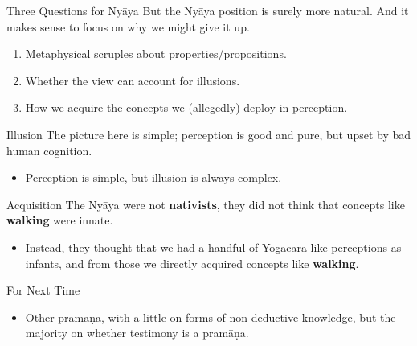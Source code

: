 \documentclass[
  17pt,
  letterpaper,
  ignorenonframetext,
  aspectratio=169,
  handout]{beamer}
\providecommand{\tightlist}{%
  \setlength{\itemsep}{0pt}\setlength{\parskip}{0pt}}\usepackage{longtable,booktabs,array}
\begin{document}
\begin{frame}{Three Questions for Nyāya}
\protect\hypertarget{three-questions-for-nyux101ya}{}
But the Nyāya position is surely more natural. And it makes sense to
focus on why we might give it up.

\begin{enumerate}[<+->]
\tightlist
\item
  Metaphysical scruples about properties/propositions.
\item
  Whether the view can account for illusions.
\item
  How we acquire the concepts we (allegedly) deploy in perception.
\end{enumerate}
\end{frame}

\begin{frame}{Illusion}
\protect\hypertarget{illusion}{}
The picture here is simple; perception is good and pure, but upset by
bad human cognition.

\begin{itemize}[<+->]
\tightlist
\item
  Perception is simple, but illusion is always complex.
\end{itemize}
\end{frame}

\begin{frame}{Acquisition}
\protect\hypertarget{acquisition}{}
The Nyāya were not \textbf{nativists}, they did not think that concepts
like \textbf{walking} were innate.

\begin{itemize}[<+->]
\tightlist
\item
  Instead, they thought that we had a handful of Yogācāra like
  perceptions as infants, and from those we directly acquired concepts
  like \textbf{walking}.
\end{itemize}
\end{frame}

\begin{frame}{For Next Time}
\protect\hypertarget{for-next-time}{}
\begin{itemize}[<+->]
\tightlist
\item
  Other pramāṇa, with a little on forms of non-deductive knowledge, but
  the majority on whether testimony is a pramāṇa.
\end{itemize}
\end{frame}
\end{document}
